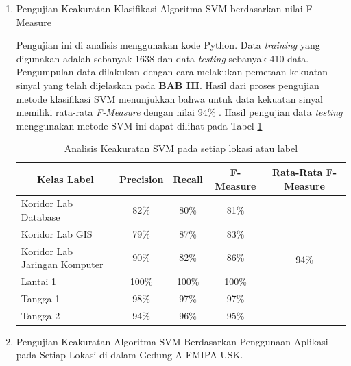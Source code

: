 \begin{enumerate}

	\item Pengujian Keakuratan Klasifikasi Algoritma SVM berdasarkan nilai F-Measure

	      \par Pengujian ini di analisis menggunakan kode Python. Data \textit{training} yang digunakan adalah sebanyak 1638 dan data \textit{testing} sebanyak 410 data. Pengumpulan data dilakukan dengan cara melakukan pemetaan kekuatan sinyal yang telah dijelaskan pada \textbf{BAB III}. Hasil dari proses pengujian metode klasifikasi SVM menunjukkan bahwa untuk data kekuatan sinyal memiliki rata-rata \textit{F-Measure} dengan nilai 94\% . Hasil pengujian data \textit{testing} menggunakan metode SVM ini dapat dilihat pada Tabel \ref{tabelpercobaansvm1}

	      \begin{table}[H]
		      \center
		      \caption{Analisis Keakuratan SVM pada setiap lokasi atau label}
		      \label{tabelpercobaansvm1}
		      \begin{tabular}{|l|c|c|c|c|}
			      \hline
			      \multicolumn{1}{|c|}{Kelas Label} & Precision & Recall & F-Measure & Rata-Rata F-Measure   \\ \hline
			      Koridor Lab Database              & 82\%      & 80\%   & 81\%      & \multirow{6}{*}{94\%} \\ \cline{1-4}
			      Koridor Lab GIS                   & 79\%      & 87\%   & 83\%      &                       \\ \cline{1-4}
			      Koridor Lab Jaringan Komputer     & 90\%      & 82\%   & 86\%      &                       \\ \cline{1-4}
			      Lantai 1                          & 100\%     & 100\%  & 100\%     &                       \\ \cline{1-4}
			      Tangga 1                          & 98\%      & 97\%   & 97\%      &                       \\ \cline{1-4}
			      Tangga 2                          & 94\%      & 96\%   & 95\%      &                       \\ \hline
		      \end{tabular}
	      \end{table}

	\item Pengujian Keakuratan Algoritma SVM Berdasarkan Penggunaan Aplikasi pada Setiap Lokasi di dalam Gedung A FMIPA USK.


\end{enumerate}
